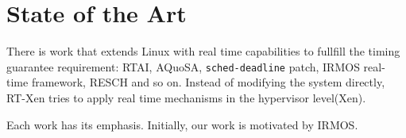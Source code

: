 \section{State of the Art}

There is work that extends Linux with real time capabilities to fullfill 
the timing guarantee requirement: RTAI\cite{rtai}, AQuoSA\cite{Luigi09}, 
\texttt{sched-deadline} patch\cite{Dario09}, 
IRMOS real-time framework, RESCH and so on.
%
%
Instead of modifying the system directly, RT-Xen tries to apply real 
time mechanisms in the hypervisor level(Xen). 

Each work has its emphasis. Initially, our work is motivated by
IRMOS. 

%
%
